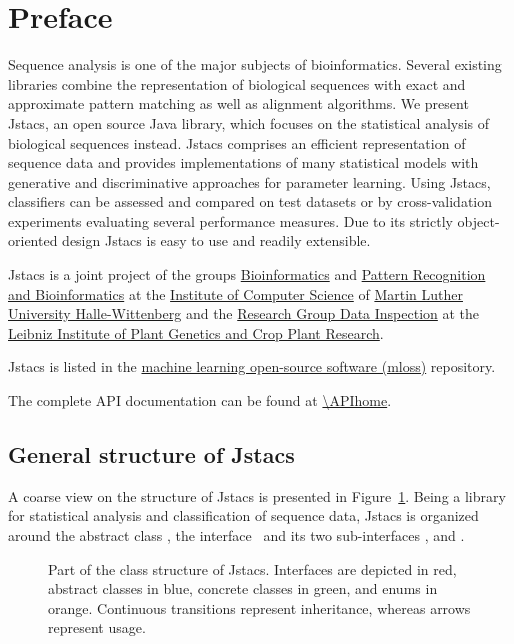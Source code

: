 \section{Preface}

Sequence analysis is one of the major subjects of bioinformatics. Several existing libraries combine the representation of biological sequences with exact and approximate pattern matching as well as alignment algorithms. We present Jstacs, an open source Java library, which focuses on the statistical analysis of biological sequences instead. Jstacs comprises an efficient representation of sequence data and provides implementations of many statistical models with generative and discriminative approaches for parameter learning. Using Jstacs, classifiers can be assessed and compared on test datasets or by cross-validation experiments evaluating several performance measures. Due to its strictly object-oriented design Jstacs is easy to use and readily extensible.

Jstacs is a joint project of the groups \href{http://www.informatik.uni-halle.de/arbeitsgruppen/bioinformatik/}{Bioinformatics} and \href{http://www.informatik.uni-halle.de/arbeitsgruppen/mustererkennung/}{Pattern Recognition and Bioinformatics} at the \href{http://www.informatik.uni-halle.de/}{Institute of Computer Science} of \href{http://www.uni-halle.de/}{Martin Luther University Halle-Wittenberg} and the \href{http://dig.ipk-gatersleben.de/}{Research Group Data Inspection} at the \href{http://www.ipk-gatersleben.de/}{Leibniz Institute of Plant Genetics and Crop Plant Research}.

Jstacs is listed in the \href{http://mloss.org/software/}{machine learning open-source software (mloss)} repository.

The complete API documentation can be found at \url{\APIhome}.

\subsection{General structure of Jstacs}

A coarse view on the structure of Jstacs is presented in Figure~\ref{fig:classes}.
Being a library for statistical analysis and classification of sequence data, Jstacs is organized around the abstract class \AbstractClassifier, the interface \StatMod~and its two sub-interfaces \TrainSM, and \DiffSM.

\begin{figure}

\caption{Part of the class structure of Jstacs. Interfaces are depicted in red, abstract classes in blue, concrete classes in green, and enums in orange. Continuous transitions represent inheritance, whereas arrows represent usage. \label{fig:classes}}
\end{figure}

